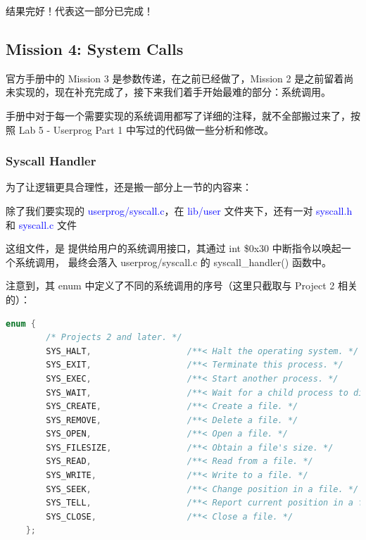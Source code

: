 \documentclass[14pt,a4paper,UTF8,twoside]{article}
\renewcommand{\texttt}[1]{\textcolor{blue}{\ttfamily #1}}
\begin{document}
结果完好！代表这一部分已完成！

\subsection{Mission 4: System Calls}

官方手册中的 Mission 3 是参数传递，在之前已经做了，Mission 2 是之前留着尚未实现的，现在补充完成了，接下来我们着手开始最难的部分：系统调用。

手册中对于每一个需要实现的系统调用都写了详细的注释，就不全部搬过来了，按照 Lab 5 - Userprog Part 1 中写过的代码做一些分析和修改。

\subsubsection{Syscall Handler}

为了让逻辑更具合理性，还是搬一部分上一节的内容来：

除了我们要实现的 \texttt{userprog/syscall.c}，在 \texttt{lib/user} 文件夹下，还有一对 \texttt{syscall.h} 和 \texttt{syscall.c} 文件

\begin{ctt}
这组文件，是 提供给用户的系统调用接口，其通过 int \$0x30 
中断指令以唤起一个系统调用，
最终会落入 userprog/syscall.c 的 syscall\_handler() 函数中。
\end{ctt}

注意到，其 enum 中定义了不同的系统调用的序号（这里只截取与 Project 2 相关的）：

\begin{lstlisting}[language=C, title= syscall.h]
    enum {
        /* Projects 2 and later. */
        SYS_HALT,                   /**< Halt the operating system. */
        SYS_EXIT,                   /**< Terminate this process. */
        SYS_EXEC,                   /**< Start another process. */
        SYS_WAIT,                   /**< Wait for a child process to die. */
        SYS_CREATE,                 /**< Create a file. */
        SYS_REMOVE,                 /**< Delete a file. */
        SYS_OPEN,                   /**< Open a file. */
        SYS_FILESIZE,               /**< Obtain a file's size. */
        SYS_READ,                   /**< Read from a file. */
        SYS_WRITE,                  /**< Write to a file. */
        SYS_SEEK,                   /**< Change position in a file. */
        SYS_TELL,                   /**< Report current position in a file. */
        SYS_CLOSE,                  /**< Close a file. */
    };
\end{lstlisting}
\end{document}
